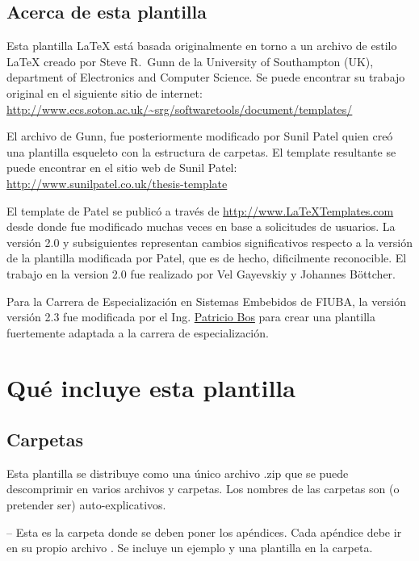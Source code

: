 \subsection{Acerca de esta plantilla}

Esta plantilla \LaTeX{} está basada originalmente en torno a un archivo de estilo \LaTeX{} creado por Steve R.\ Gunn de la  University of Southampton (UK), department of Electronics and Computer Science. Se puede encontrar su trabajo original en el siguiente sitio de internet:
\url{http://www.ecs.soton.ac.uk/~srg/softwaretools/document/templates/}

El archivo de Gunn,  fue posteriormente modificado por Sunil Patel quien creó una plantilla esqueleto con la estructura de carpetas. El template resultante se puede encontrar en el sitio web de Sunil Patel:
\url{http://www.sunilpatel.co.uk/thesis-template}

El template de Patel se publicó a través de  \url{http://www.LaTeXTemplates.com} desde donde fue modificado muchas veces en base a solicitudes de usuarios. La versión 2.0 y subsiguientes representan cambios significativos respecto a la versión de la plantilla modificada por Patel, que es de hecho, dificilmente reconocible. El trabajo en la version 2.0 fue realizado por Vel Gayevskiy y Johannes Böttcher.

Para la Carrera de Especialización en Sistemas Embebidos de FIUBA, la versión versión 2.3 fue modificada por el Ing. \href{mailto:pbos@fi.uba.ar}{Patricio Bos} para crear una plantilla fuertemente adaptada a la carrera de especialización.


\section{Qué incluye esta plantilla}

\subsection{Carpetas}

Esta plantilla se distribuye como una único archivo .zip que se puede descomprimir en varios archivos y carpetas. Los nombres de las carpetas son (o pretender ser) auto-explicativos.

 -- Esta es la carpeta donde se deben poner los apéndices. Cada apéndice debe ir en su propio archivo . Se incluye un ejemplo y una plantilla en la carpeta.

